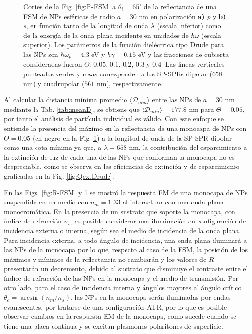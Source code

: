 \begin{figure}[h!]
	\caption{Cortes de la Fig. \ref{fig:R-FSM} a $\theta_i = 65^\circ$ de la reflectancia de una FSM de NPs esféricas de radio $a=30$ nm en polarización \textbf{a)} \emph{p} y \textbf{b)} \emph{s}, en función tanto de la longitud de onda $\lambda$ (escala inferior) como de la energía de la onda plana incidente en unidades de $\hbar\omega$ (escala superior). Los parámetros de la función dieléctrica tipo Drude para las NPs son $\hbar\omega_p = 4.3$ eV y $\hbar\gamma = 0.15$ eV y las fracciones de cubierta consideradas fueron $\Theta$: $0. 05$, $0. 1$, $0. 2$, $0. 3$ y $0. 4$. Las líneas verticales punteadas verdes y rosas corresponden a las SP-SPRs dipolar ($658$ nm) y cuadrupolar ($561$ nm), respectivamente.}\label{fig:FSM-Cuts}
	\end{figure}	

Al calcular la distancia mínima promedio $\langle\mathscr{D}_{min}\rangle$ entre las NPs  de $a = 30$ nm mediante la Tab. \ref{tab:meanD}, se obtiene que $\langle\mathscr{D}_{min}\rangle  = 177.8$ nm para $\Theta = 0.05$, por tanto el análisis de partícula individual es válido. Con este enfoque se entiende la presencia del máximo en la reflectancia de una monocapa  de NPs con $\Theta=0.05$ (en negro en la Fig. \ref{fig:FSM-Cuts}) a la longitud de onda de la SP-SPR dipolar como una cota mínima ya que, a $\lambda=658$ nm, la contribución del esparcimiento a la extinción de luz de cada una de las NPs que conforman la monocapa no es despreciable, como se observa en las eficiencias de extinción y de esparcimiento graficadas en la Fig. \ref{fig:QextDrude}.

En las Figs. \ref{fig:R-FSM} y \ref{fig:FSM-Cuts} se mostró la respuesta EM de una monocapa de NPs suspendida en un medio con $n_m=1.33$ al interactuar con una onda plana monocromática. En la presencia de un sustrato que soporte la monocapa, con índice de refracción $n_s$, es posible considerar una iluminación en configuración de incidencia externa o interna, seg\'un sea el medio de incidencia de la onda plana. Para incidencia externa, a todo ángulo de incidencia,  una onda plana iluminará a las NPs de la monocapa por lo que, respecto al caso de la FSM, la posición de los máximos y mínimos de la reflectancia no cambiarán y los valores de $R$ presentarán un decremento, debido al sustrato que disminuye el contraste entre el índice de refracción de las NPs en la monocapa y el medio de transmisión. Por otro lado, para el caso de incidencia interna y ángulos mayores al ángulo crítico $\theta_c = \arcsin(n_m/n_s)$, las NPs en la monocapa serán iluminadas por ondas evanescentes, por tratarse de una configuración ATR, por lo que es posible  observar cambios en la respuesta EM de la monocapa, como sucede  cuando se tiene una placa continua y se excitan plasmones polaritones de superficie.

